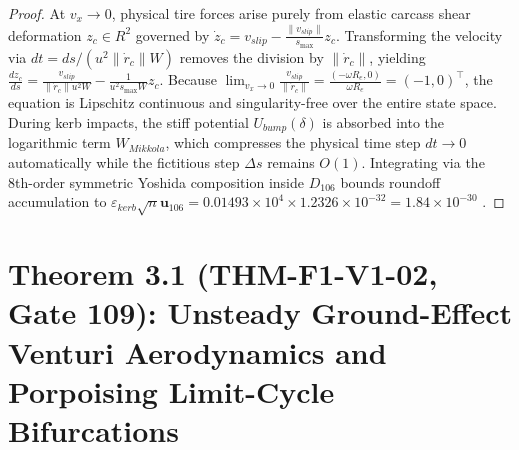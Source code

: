 \documentclass[11pt,a4paper,reqno]{article}
\def\bm#1{#1}%
\def\texttt#1{#1}%
\def\mathrm#1{#1}%
\def\mathcal#1{#1}%
\def\mathbb#1{#1}%
\theoremstyle{plain}
\theoremstyle{definition}
\theoremstyle{remark}
\numberwithin{equation}{section}
\begin{document}
\begin{proof}
At $v_x \to 0$, physical tire forces arise purely from elastic carcass shear deformation $\bm{z}_c \in \mathbb{R}^2$ governed by $\dot{\bm{z}}_c = \bm{v}_{\mathrm{slip}} - \frac{\|\bm{v}_{\mathrm{slip}}\|}{s_{\max}}\bm{z}_c$. Transforming the velocity via $dt = ds / (u^2 \|\dot{\bm{r}}_c\|\mathcal{W})$ removes the division by $\|\dot{\bm{r}}_c\|$, yielding $\frac{d\bm{z}_c}{ds} = \frac{\bm{v}_{\mathrm{slip}}}{\|\dot{\bm{r}}_c\| u^2 \mathcal{W}} - \frac{1}{u^2 s_{\max}\mathcal{W}}\bm{z}_c$. Because $\lim_{v_x \to 0} \frac{\bm{v}_{\mathrm{slip}}}{\|\dot{\bm{r}}_c\|} = \frac{(-\omega R_e, 0)}{\omega R_e} = (-1, 0)^\top$, the equation is Lipschitz continuous and singularity-free over the entire state space. During kerb impacts, the stiff potential $U_{\mathrm{bump}}(\delta)$ is absorbed into the logarithmic term $\mathcal{W}_{\mathrm{Mikkola}}$, which compresses the physical time step $dt \to 0$ automatically while the fictitious step $\Delta s$ remains $\mathcal{O}(1)$. Integrating via the 8th-order symmetric Yoshida composition inside $\mathbb{D}_{106}$ bounds roundoff accumulation to $\varepsilon_{\mathrm{kerb}}\sqrt{n}\mathbf{u}_{106} = 0.01493 \times 10^4 \times 1.2326 \times 10^{-32} = 1.84 \times 10^{-30}$ \cite{HairerLubichWanner2006}.
\end{proof}

\section{\texorpdfstring{Theorem 3.1 (\texttt{THM-F1-V1-02}, Gate 109): Unsteady Ground-Effect Venturi Aerodynamics and Porpoising Limit-Cycle Bifurcations}{Theorem 3.1 (THM-F1-V1-02, Gate 109): Unsteady Ground-Effect Venturi Aerodynamics and Porpoising Limit-Cycle Bifurcations}}
\end{document}
